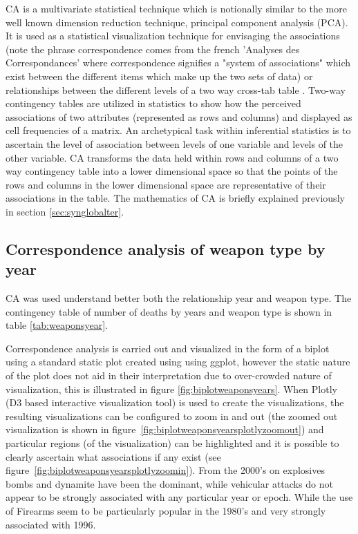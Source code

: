 CA is a multivariate statistical technique which is notionally similar to the more well known dimension reduction technique, principal component analysis (PCA). It is used as a statistical visualization technique for envisaging the associations (note the phrase correspondence comes from the french 'Analyses des Correspondances' where correspondence signifies a "system of associations" which exist between the different items which make up the two sets of data) or relationships between the different levels of a two way cross-tab table \citep{husson2010exploratory}. Two-way contingency tables are utilized in statistics to show how the perceived associations of two attributes (represented as rows and columns) and displayed as cell frequencies of a matrix. An archetypical task within inferential statistics is to ascertain the level of association between levels of one variable and levels of the other variable. CA transforms the data held within rows and columns of a two way contingency table into a lower dimensional space so that the points of the rows and columns in the lower dimensional space are representative of their associations in the table. The mathematics of CA is briefly explained previously in section \ref{sec:synglobalter}.  

\subsection{Correspondence analysis of weapon type by year}\label{viewing-deaths-by-weapon-vector-type-CA}

CA was used understand better both the relationship year and weapon type. The contingency table of number of deaths by years and weapon type is shown in table \ref{tab:weaponsyear}.

Correspondence analysis is carried out and visualized in the form of a biplot using a standard static plot created using using ggplot, however the static nature of the plot does not aid in their interpretation due to over-crowded nature of visualization, this is illustrated in figure \ref{fig:biplotweaponsyears}. When Plotly (D3 based interactive visualization tool) is used to create the visualizations, the resulting visualizations can be configured to zoom in and out (the zoomed out visualization is shown in figure~\ref{fig:biplotweaponsyearsplotlyzoomout}) and particular regions (of the visualization) can be highlighted and it is possible to clearly ascertain what associations if any exist (see figure~\ref{fig:biplotweaponsyearsplotlyzoomin}). From the 2000's on explosives bombs and dynamite have been the dominant, while vehicular attacks do not appear to be strongly associated with any particular year or epoch. While the use of Firearms seem to be particularly popular in the 1980's and very strongly associated with 1996.
 
